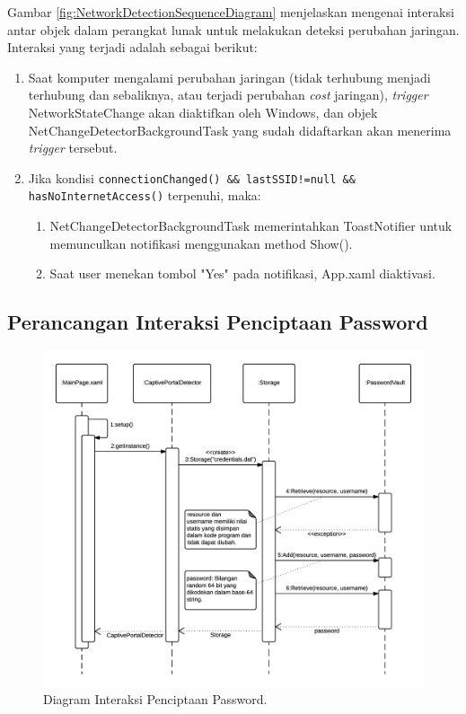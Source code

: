 Gambar \ref{fig:NetworkDetectionSequenceDiagram} menjelaskan mengenai interaksi antar objek dalam perangkat lunak untuk melakukan deteksi perubahan jaringan. Interaksi yang terjadi adalah sebagai berikut:

\begin{enumerate}
    \item{Saat komputer mengalami perubahan jaringan (tidak terhubung menjadi terhubung dan sebaliknya, atau terjadi perubahan \textit{cost} jaringan), \textit{trigger} NetworkStateChange akan diaktifkan oleh Windows, dan objek NetChangeDetectorBackgroundTask yang sudah didaftarkan akan menerima \textit{trigger} tersebut.}
    \item{Jika kondisi \texttt{connectionChanged() \&\& lastSSID!=null \&\& hasNoInternetAccess()} terpenuhi, maka:}
    \begin{enumerate}
        \item{NetChangeDetectorBackgroundTask memerintahkan ToastNotifier untuk memunculkan notifikasi menggunakan method Show().}
        \item{Saat user menekan tombol "Yes" pada notifikasi, App.xaml diaktivasi.}
    \end{enumerate}
\end{enumerate}

\subsection{Perancangan Interaksi Penciptaan Password}
\label{subsec:perancangan_interaksi_penciptaan_password}

\begin{figure}[!htb]
    \centering
    \includegraphics[scale=0.9]{Gambar/SequenceDiagramPasswordGeneration.png}
    \caption[Diagram Interaksi Penciptaan Password.]{Diagram Interaksi Penciptaan Password.} 
    \label{fig:PasswordGenerationSequenceDiagram}
\end{figure}


